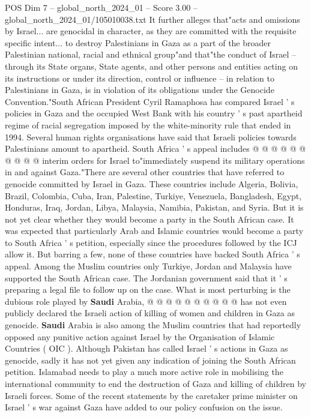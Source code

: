 \begin{textsample}{POS Dim 7 – global\_north\_2024\_01 – Score 3.00 – global\_north\_2024\_01/105010038.txt}
It further alleges that"acts and omissions by Israel... are genocidal in character, as they are committed with the requisite specific intent... to destroy Palestinians in Gaza as a part of the broader Palestinian national, racial and ethnical group"and that"the conduct of Israel -- through its State organs, State agents, and other persons and entities acting on its instructions or under its direction, control or influence -- in relation to Palestinians in Gaza, is in violation of its obligations under the Genocide Convention."South African President Cyril Ramaphosa has compared Israel ' s policies in Gaza and the occupied West Bank with his country ' s past apartheid regime of racial segregation imposed by the white-minority rule that ended in 1994.
Several human rights organisations have said that Israeli policies towards Palestinians amount to apartheid.
South Africa ' s appeal includes @ @ @ @ @ @ @ @ @ @ interim orders for Israel to"immediately suspend its military operations in and against Gaza."There are several other countries that have referred to genocide committed by Israel in Gaza.
These countries include Algeria, Bolivia, Brazil, Colombia, Cuba, Iran, Palestine, Turkiye, Venezuela, Bangladesh, Egypt, Honduras, Iraq, Jordan, Libya, Malaysia, Namibia, Pakistan, and Syria.
But it is not yet clear whether they would become a party in the South African case.
It was expected that particularly Arab and Islamic countries would become a party to South Africa ' s petition, especially since the procedures followed by the ICJ allow it.
But barring a few, none of these countries have backed South Africa ' s appeal.
Among the Muslim countries only Turkiye, Jordan and Malaysia have supported the South African case.
The Jordanian government said that it ' s preparing a legal file to follow up on the case.
What is most perturbing is the dubious role played by \textbf{Saudi} Arabia, @ @ @ @ @ @ @ @ @ @ has not even publicly declared the Israeli action of killing of women and children in Gaza as genocide. \textbf{Saudi} Arabia is also among the Muslim countries that had reportedly opposed any punitive action against Israel by the Organisation of Islamic Countries ( OIC ).
Although Pakistan has called Israel ' s actions in Gaza as genocide, sadly it has not yet given any indication of joining the South African petition.
Islamabad needs to play a much more active role in mobilising the international community to end the destruction of Gaza and killing of children by Israeli forces.
Some of the recent statements by the caretaker prime minister on Israel ' s war against Gaza have added to our policy confusion on the issue.

\end{textsample}
